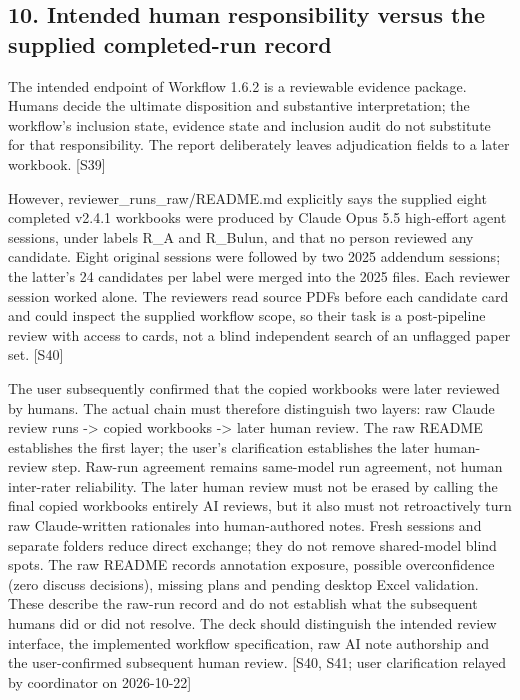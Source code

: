 \documentclass[10pt,a4paper]{article}
\begin{document}
\subsection*{10.\allowbreak{} Intended human responsibility versus the supplied completed-\allowbreak{}run record}
The intended endpoint of Workflow 1.\allowbreak{}6.\allowbreak{}2 is a reviewable evidence package.\allowbreak{} Humans decide the ultimate disposition and substantive interpretation; the workflow's inclusion state, evidence state and inclusion audit do not substitute for that responsibility.\allowbreak{} The report deliberately leaves adjudication fields to a later workbook.\allowbreak{} [S39]\par
However, reviewer\_\allowbreak{}runs\_\allowbreak{}raw/\allowbreak{}README.\allowbreak{}md explicitly says the supplied eight completed v2.\allowbreak{}4.\allowbreak{}1 workbooks were produced by Claude Opus 5.\allowbreak{}5 high-\allowbreak{}effort agent sessions, under labels R\_\allowbreak{}A and R\_\allowbreak{}Bulun, and that no person reviewed any candidate.\allowbreak{} Eight original sessions were followed by two 2025 addendum sessions; the latter's 24 candidates per label were merged into the 2025 files.\allowbreak{} Each reviewer session worked alone.\allowbreak{} The reviewers read source PDFs before each candidate card and could inspect the supplied workflow scope, so their task is a post-\allowbreak{}pipeline review with access to cards, not a blind independent search of an unflagged paper set.\allowbreak{} [S40]\par
The user subsequently confirmed that the copied workbooks were later reviewed by humans.\allowbreak{} The actual chain must therefore distinguish two layers: raw Claude review runs -\allowbreak{}> copied workbooks -\allowbreak{}> later human review.\allowbreak{} The raw README establishes the first layer; the user's clarification establishes the later human-\allowbreak{}review step.\allowbreak{} Raw-\allowbreak{}run agreement remains same-\allowbreak{}model run agreement, not human inter-\allowbreak{}rater reliability.\allowbreak{} The later human review must not be erased by calling the final copied workbooks entirely AI reviews, but it also must not retroactively turn raw Claude-\allowbreak{}written rationales into human-\allowbreak{}authored notes.\allowbreak{} Fresh sessions and separate folders reduce direct exchange; they do not remove shared-\allowbreak{}model blind spots.\allowbreak{} The raw README records annotation exposure, possible overconfidence (zero discuss decisions), missing plans and pending desktop Excel validation.\allowbreak{} These describe the raw-\allowbreak{}run record and do not establish what the subsequent humans did or did not resolve.\allowbreak{} The deck should distinguish the intended review interface, the implemented workflow specification, raw AI note authorship and the user-\allowbreak{}confirmed subsequent human review.\allowbreak{} [S40, S41; user clarification relayed by coordinator on 2026-\allowbreak{}10-\allowbreak{}22]\par
\end{document}
